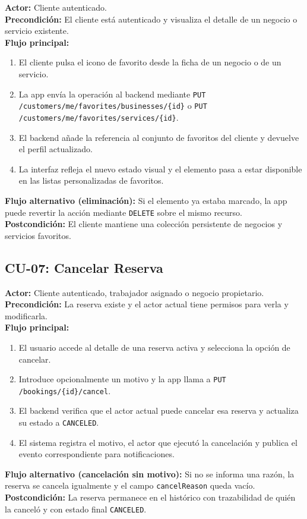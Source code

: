 \documentclass[12pt,a4paper,twoside]{report}
\begin{document}
\begin{tcolorbox}[definicionStyle, title={CU-06 — Añadir o Quitar Favoritos}]
\textbf{Actor:} Cliente autenticado. \\
\textbf{Precondición:} El cliente está autenticado y visualiza el detalle de un negocio o servicio existente. \\
\textbf{Flujo principal:}
\begin{enumerate}
  \item El cliente pulsa el icono de favorito desde la ficha de un negocio o de un servicio.
  \item La app envía la operación al backend mediante \texttt{PUT /customers/me/favorites/businesses/\{id\}} o \texttt{PUT /customers/me/favorites/services/\{id\}}.
  \item El backend añade la referencia al conjunto de favoritos del cliente y devuelve el perfil actualizado.
  \item La interfaz refleja el nuevo estado visual y el elemento pasa a estar disponible en las listas personalizadas de favoritos.
\end{enumerate}
\textbf{Flujo alternativo (eliminación):} Si el elemento ya estaba marcado, la app puede revertir la acción mediante \texttt{DELETE} sobre el mismo recurso. \\
\textbf{Postcondición:} El cliente mantiene una colección persistente de negocios y servicios favoritos.
\end{tcolorbox}

\subsection{CU-07: Cancelar Reserva}

\begin{tcolorbox}[definicionStyle, title={CU-07 — Cancelación de Reserva}]
\textbf{Actor:} Cliente autenticado, trabajador asignado o negocio propietario. \\
\textbf{Precondición:} La reserva existe y el actor actual tiene permisos para verla y modificarla. \\
\textbf{Flujo principal:}
\begin{enumerate}
  \item El usuario accede al detalle de una reserva activa y selecciona la opción de cancelar.
  \item Introduce opcionalmente un motivo y la app llama a \texttt{PUT /bookings/\{id\}/cancel}.
  \item El backend verifica que el actor actual puede cancelar esa reserva y actualiza su estado a \texttt{CANCELED}.
  \item El sistema registra el motivo, el actor que ejecutó la cancelación y publica el evento correspondiente para notificaciones.
\end{enumerate}
\textbf{Flujo alternativo (cancelación sin motivo):} Si no se informa una razón, la reserva se cancela igualmente y el campo \texttt{cancelReason} queda vacío. \\
\textbf{Postcondición:} La reserva permanece en el histórico con trazabilidad de quién la canceló y con estado final \texttt{CANCELED}.
\end{tcolorbox}
\end{document}
